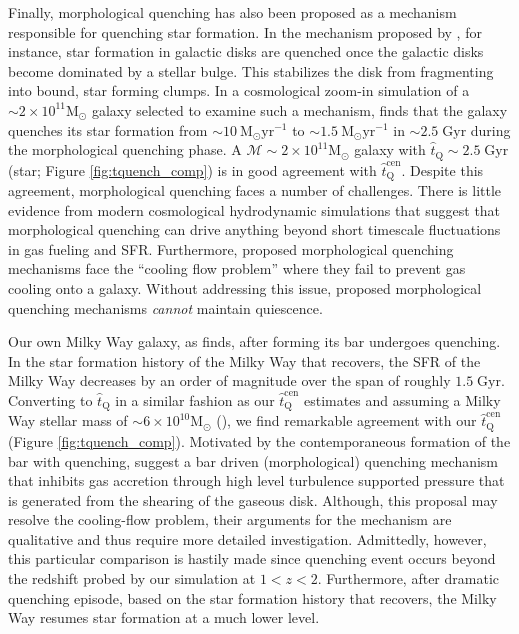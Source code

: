 Finally, morphological quenching has also been proposed as a mechanism responsible 
for quenching star formation. In the mechanism proposed by \cite{Martig:2009aa}, 
for instance, star formation in galactic disks are 
quenched once the galactic disks become dominated by
a stellar bulge. This stabilizes the disk from fragmenting 
into bound, star forming clumps. In a cosmological zoom-in simulation of a 
$\sim 2 \times 10^{11} \mathrm{M}_\odot$ galaxy selected to examine such 
a mechanism, \cite{Martig:2009aa} finds that the galaxy quenches its star formation
from $\sim 10~\mathrm{M}_\odot\mathrm{yr}^{-1}$ to 
$\sim 1.5~\mathrm{M}_\odot\mathrm{yr}^{-1}$
in $\sim 2.5\;\mathrm{Gyr}$ during the morphological quenching phase. A 
$\mathcal{M} \sim 2 \times 10^{11} \mathrm{M}_\odot$ galaxy with 
$\hat{t}_\mathrm{Q} \sim 2.5\;\mathrm{Gyr}$ (star; Figure \ref{fig:tquench_comp}) 
is in good agreement with $\hat{t}_\mathrm{Q}^\mathrm{cen}$. 
Despite this agreement, morphological quenching faces a number 
of challenges. There is little evidence from modern cosmological
hydrodynamic simulations that suggest that morphological quenching can
drive anything beyond short timescale fluctuations in gas fueling and 
SFR. Furthermore, proposed morphological quenching mechanisms
face the ``cooling flow problem'' where they fail to prevent 
gas cooling onto a galaxy. Without addressing this issue, proposed 
morphological quenching mechanisms {\em cannot} maintain quiescence.

Our own Milky Way galaxy, as \cite{Haywood:2016aa} finds, after forming its
bar undergoes quenching. In the star formation history of the Milky Way 
that \cite{Haywood:2016aa} recovers, the SFR of the Milky Way decreases 
by an order of magnitude over the span of roughly 
$1.5\;\mathrm{Gyr}$. Converting to $\hat{t}_\mathrm{Q}$ in a similar fashion
as our $\hat{t}_\mathrm{Q}^\mathrm{cen}$ estimates and assuming a Milky Way stellar
mass of $\sim 6\times 10^{10}\mathrm{M}_\odot$ 
(\citealt{Licquia:2015aa, Haywood:2016aa}), 
we find remarkable agreement with our $\hat{t}_\mathrm{Q}^\mathrm{cen}$ 
(Figure \ref{fig:tquench_comp}). 
Motivated by the contemporaneous formation of the bar with quenching, 
\cite{Haywood:2016aa} suggest a bar driven (morphological) quenching mechanism 
that inhibits gas accretion through high level turbulence supported pressure 
that is generated from the shearing of the gaseous disk. Although, 
this proposal may resolve the cooling-flow problem, their arguments for the
mechanism are qualitative and thus require more detailed investigation. 
Admittedly, however, this particular comparison is hastily made since quenching 
event occurs beyond the redshift probed by our simulation at 
$1 < z < 2$. Furthermore, after dramatic quenching episode, based on 
the star formation history that \cite{Haywood:2016aa} recovers, the Milky Way
resumes star formation at a much lower level. 

